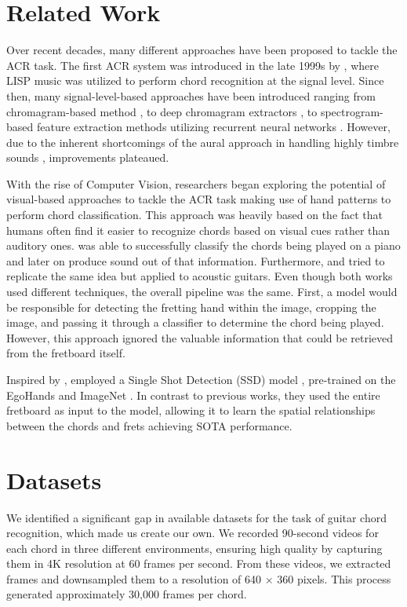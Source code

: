 \documentclass[10pt,twocolumn,letterpaper]{article}
\begin{document}
\section{Related Work}
Over recent decades, many different approaches have been proposed to tackle the ACR task. The first ACR system was introduced in the late 1999s by \cite{takuya1999realtime}, where LISP music was utilized to perform chord recognition at the signal level. Since then, many signal-level-based approaches have been introduced ranging from chromagram-based method \cite{stark2009real}, to deep chromagram extractors \cite{korzeniowski2016feature}, to spectrogram-based feature extraction methods utilizing recurrent neural networks \cite{boulanger2013audio}. However, due to the inherent shortcomings of the aural approach in handling highly timbre sounds \cite{du2023conditional}, improvements plateaued.

With the rise of Computer Vision, researchers began exploring the potential of visual-based approaches to tackle the ACR task making use of hand patterns to perform chord classification. This approach was heavily based on the fact that humans often find it easier to recognize chords based on visual cues rather than auditory ones. \cite{su2020audeo} was able to successfully classify the chords being played on a piano and later on produce sound out of that information. Furthermore, \cite{tran2019cnn} and \cite{ooaku2018guitar} tried to replicate the same idea but applied to acoustic guitars. Even though both works used different techniques, the overall pipeline was the same. First, a model would be responsible for detecting the fretting hand within the image, cropping the image, and passing it through a classifier to determine the chord being played. However, this approach ignored the valuable information that could be retrieved from the fretboard itself.

Inspired by \cite{tran2019cnn, ooaku2018guitar}, \cite{Kristian_Zaman_Tenoyo_Jodhinata_2024} employed a Single Shot Detection (SSD) model \cite{sandler2018mobilenetv2}, pre-trained on the EgoHands \cite{Bambach_2015_ICCV} and ImageNet \cite{deng2009imagenet}. In contrast to previous works, they used the entire fretboard as input to the model, allowing it to learn the spatial relationships between the chords and frets achieving SOTA performance.

\section{Datasets}
We identified a significant gap in available datasets for the task of guitar chord recognition, which made us create our own. We recorded 90-second videos for each chord in three different environments, ensuring high quality by capturing them in 4K resolution at 60 frames per second. From these videos, we extracted frames and downsampled them to a resolution of 640 $\times$ 360 pixels. This process generated approximately 30,000 frames per chord.
\end{document}

